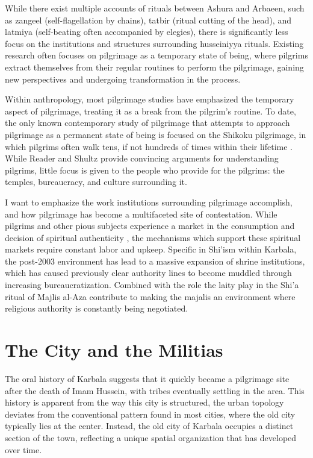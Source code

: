 While there exist multiple accounts of rituals between Ashura and Arbaeen, such as zangeel (self-flagellation by chains), tatbir (ritual cutting of the head), and latmiya (self-beating often accompanied by elegies), there is significantly less focus on the institutions and structures surrounding husseiniyya rituals. Existing research often focuses on pilgrimage as a temporary state of being, where pilgrims extract themselves from their regular routines to perform the pilgrimage, gaining new perspectives and undergoing transformation in the process.

Within anthropology, most pilgrimage studies have emphasized the temporary aspect of pilgrimage, treating it as a break from the pilgrim's routine. To date, the only known contemporary study of pilgrimage that attempts to approach pilgrimage as a permanent state of being is focused on the Shikoku pilgrimage, in which pilgrims often walk tens, if not hundreds of times within their lifetime \cite[9]{reader_pilgrims_2021}. While Reader and Shultz provide convincing arguments for understanding pilgrims, little focus is given to the people who provide for the pilgrims: the temples, bureaucracy, and culture surrounding it.



I want to emphasize the work institutions surrounding pilgrimage accomplish, and how pilgrimage has become a multifaceted site of contestation. While pilgrims and other pious subjects experience a market in the consumption and decision of spiritual authenticity \cite{moufahim_pilgrimage_2018}\cite{mujtaba_husein_phenomenological_2018}, the mechanisms which support these spiritual markets require constant labor and upkeep. Specific in Shi'ism within Karbala, the post-2003 environment has lead to a massive expansion of shrine institutions, which has caused previously clear authority lines to become muddled through increasing bureaucratization. Combined with the role the laity play in the Shi'a ritual of Majlis al-Aza contribute to making the majalis an environment where religious authority is constantly being negotiated. 

\section{The City and the Militias}
The oral history of Karbala suggests that it quickly became a pilgrimage site after the death of Imam Hussein, with tribes eventually settling in the area. This history is apparent from the way this city is structured, the urban topology deviates from the conventional pattern found in most cities, where the old city typically lies at the center. Instead, the old city of Karbala occupies a distinct section of the town, reflecting a unique spatial organization that has developed over time. 


